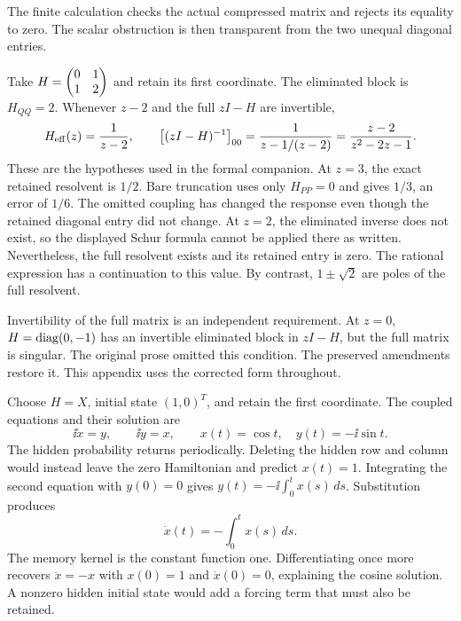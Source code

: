 The finite calculation checks the actual compressed matrix and rejects its equality to zero. The scalar obstruction is then transparent from the two unequal diagonal entries.

Take $H=\begin{pmatrix}0&1\\1&2\end{pmatrix}$ and retain its first coordinate. The eliminated block is $H_{QQ}=2$. Whenever $z-2$ and the full $zI-H$ are invertible,
\[
H_{\rm eff}(z)=\frac1{z-2},\qquad
\bigl[(zI-H)^{-1}\bigr]_{00}
=\frac1{z-1/(z-2)}=\frac{z-2}{z^2-2z-1}.
\]
These are the hypotheses used in the formal companion.
At $z=3$, the exact retained resolvent is $1/2$. Bare truncation uses only $H_{PP}=0$ and gives $1/3$, an error of $1/6$. The omitted coupling has changed the response even though the retained diagonal entry did not change.
At $z=2$, the eliminated inverse does not exist, so the displayed Schur formula cannot be applied there as written. Nevertheless, the full resolvent exists and its retained entry is zero. The rational expression has a continuation to this value. By contrast, $1\pm\sqrt2$ are poles of the full resolvent.

Invertibility of the full matrix is an independent requirement. At $z=0$, $H=\operatorname{diag}(0,-1)$ has an invertible eliminated block in $zI-H$, but the full matrix is singular. The original prose omitted this condition. The preserved amendments restore it. This appendix uses the corrected form throughout.

Choose $H=X$, initial state $(1,0)^T$, and retain the first coordinate. The coupled equations and their solution are
\[
\ii\dot x=y,\qquad \ii\dot y=x,\qquad
x(t)=\cos t,\quad y(t)=-\ii\sin t.
\]
The hidden probability returns periodically. Deleting the hidden row and column would instead leave the zero Hamiltonian and predict $x(t)=1$.
Integrating the second equation with $y(0)=0$ gives $y(t)=-\ii\int_0^tx(s)\,ds$. Substitution produces
\[
\dot x(t)=-\int_0^tx(s)\,ds.
\]
The memory kernel is the constant function one. Differentiating once more recovers $\ddot x=-x$ with $x(0)=1$ and $\dot x(0)=0$, explaining the cosine solution. A nonzero hidden initial state would add a forcing term that must also be retained.

